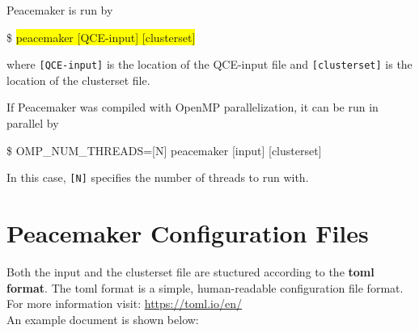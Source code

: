\documentclass{scrartcl}
\newcommand{\amf}{a_\mathrm{mf}}
\newcommand{\bxv}{b_\mathrm{xv}}
\begin{document}
Peacemaker is run by
\begin{addmargin}[1cm]{0cm}
    \ttfamily
    \$ \colorbox{yellow}{peacemaker [QCE-input] [clusterset]}
\end{addmargin}
where \texttt{[QCE-input]} is the location of the QCE-input file and \texttt{[clusterset]} 
is the location of the clusterset file.

If Peacemaker was compiled with OpenMP parallelization, it can be run in parallel by
\begin{addmargin}[1cm]{0cm}
    \ttfamily
    \$ OMP\_NUM\_THREADS=[N] peacemaker [input] [clusterset]
\end{addmargin}
In this case, \texttt{[N]} specifies the number of threads to run with.


%
%

\section{Peacemaker Configuration Files}
\label{sec:config}

Both the input and the clusterset file are stuctured according to the \textbf{toml format}.
The toml format is a simple, human-readable configuration file format.
For more information visit: \url{https://toml.io/en/}\\
An example document is shown below:
\end{document}
